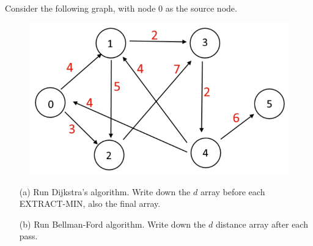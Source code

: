 \noindent {} 
Consider the following graph, with node 0 as the source node.
\begin{figure}[!h]
    \centering
    \includegraphics[width=0.5\linewidth]{HWs//HW12//figures/1.png}
\end{figure}
\begin{itemize}
    \item[(a)] Run Dijkstra’s algorithm. Write down the $d$ array before each EXTRACT-MIN, also the final array. 
    \begin{table}[!h]
        \centering
    \end{table}
    \item[(b)] Run Bellman-Ford algorithm. Write down the $d$ distance array after each pass.
    \begin{table}[!h]
        \centering
\end{table}
\end{itemize}
